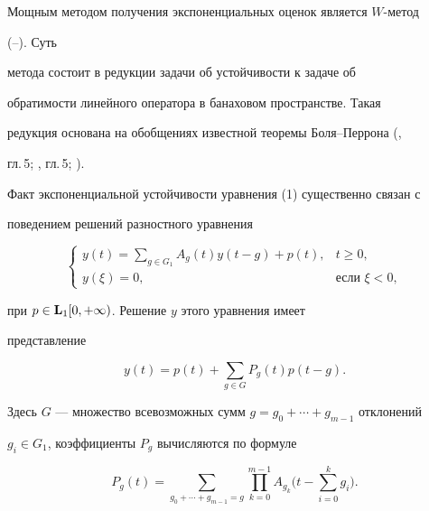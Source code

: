 Мощным методом получения экспоненциальных оценок является $W$-метод


(\cite{Az1}--\cite{Ber}). Суть


метода состоит в редукции задачи об устойчивости к задаче об


обратимости линейного оператора в банаховом пространстве. Такая


редукция основана на обобщениях известной теоремы Боля--Перрона (\cite{Ku3},


гл.\,5; \cite{Az1}, гл.\,5; \cite{Az2}).





Факт экспоненциальной устойчивости уравнения (1) существенно связан с


поведением решений разностного уравнения


%


\begin{equation}


\begin{cases}


y(t)=\sum\limits_{g\in G_1}A_g(t)y(t-g)+p(t), & t\ge0,\\


%


y(\xi)=0, & \text{если }\xi<0,


\end{cases}


\end{equation}


%


при $p\in\bold L_1[0,+\infty)$. Решение $y$ этого уравнения имеет


представление


%


\begin{equation}


y(t)=p(t)+\sum_{g\in G}P_g(t)p(t-g).


\end{equation}


%


Здесь $G$ --- множество всевозможных сумм $g=g_0+\dotsb+g_{m-1}$ отклонений


$g_i\in G_1$, коэффициенты $P_g$ вычисляются по формуле


%


\begin{equation}


P_g(t)=\sum_{g_0+\dotsb+


g_{m-1}=g}\prod_{k=0}^{m-1}A_{g_k}\biggl(t-\sum_{i=0}^kg_i\biggr).


\end{equation}



